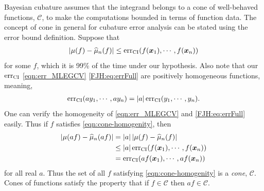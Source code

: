 \documentclass{svjour3}                     %
\newcommand{\bm}[1]{\boldsymbol{#1}}
\newcommand{\vx}{\bm{x}}
\newcommand{\hmu}{\widehat{\mu}}
\newcommand{\CI}{\textup{CI}}
\newcommand{\err}{\textup{err}}
\def\abs#1{\ensuremath{\left \lvert #1 \right \rvert}}
\begin{document}
Bayesian cubature assumes that the integrand belongs to a cone of well-behaved functions, $\mathscr{C}$, to make the computations bounded in terms of function data. The concept of cone in general for cubature error analysis can be stated using the error bound definition. 
Suppose that 
\begin{align}
\label{eqn:cone-homogenity}
\abs{\mu(f) - \hmu_n(f)} \le \err_{\CI} (f(\vx_1), \cdots, f(\vx_n))
\end{align}
for some $f$, which it is 99\% of the time under our hypothesis. Also note that our $\err_{\CI}$ \eqref{eqn:err_MLEGCV} \eqref{FJH:eq:errFull} are positively homogeneous functions, meaning, 
\begin{align*}
\err_{\CI} (a y_1, \cdots, a y_n) = \abs{a} \err_{\CI} ( y_1, \cdots,  y_n).
\end{align*}
One can verify the homogeneity of \eqref{eqn:err_MLEGCV} and \eqref{FJH:eq:errFull} easily.
Thus if $f$ satisfies \eqref{eqn:cone-homogenity}, then
\begin{align*}
\abs{\mu(af) - \hmu_n(af)} &= \abs{a} \abs{\mu(f) - \hmu_n(f)} \\
& \le \abs{a} \err_{\CI} (f(\vx_1), \cdots, f(\vx_n) ) \\
& = \err_{\CI} (a f(\vx_1), \cdots, a f(\vx_n))
\end{align*}
for all real $a$. Thus the set of all $f$ satisfying \eqref{eqn:cone-homogenity} is a \emph{cone}, $\mathscr{C}$. Cones of functions satisfy the property that if $f \in \mathscr{C}$ then $af \in \mathscr{C}$.

\end{document}
